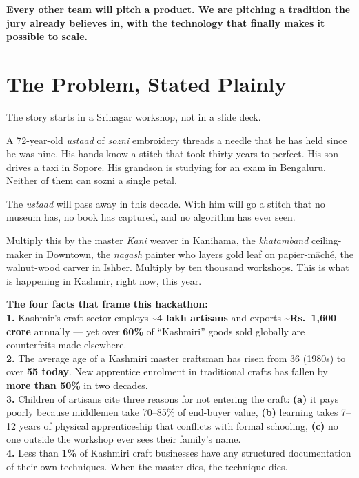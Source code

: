 \documentclass[11pt, a4paper]{article}
\begin{document}
\begin{insightbox}
\textbf{Every other team will pitch a product. We are pitching a tradition the jury already believes in, with the technology that finally makes it possible to scale.}
\end{insightbox}

\section{The Problem, Stated Plainly}

The story starts in a Srinagar workshop, not in a slide deck.

A 72-year-old {\itshape ustaad} of {\itshape sozni} embroidery threads a needle that he has held since he was nine. His hands know a stitch that took thirty years to perfect. His son drives a taxi in Sopore. His grandson is studying for an exam in Bengaluru. Neither of them can sozni a single petal.

The {\itshape ustaad} will pass away in this decade. With him will go a stitch that no museum has, no book has captured, and no algorithm has ever seen.

Multiply this by the master {\itshape Kani} weaver in Kanihama, the {\itshape khatamband} ceiling-maker in Downtown, the {\itshape naqash} painter who layers gold leaf on papier-mâché, the walnut-wood carver in Ishber. Multiply by ten thousand workshops. This is what is happening in Kashmir, right now, this year.

\begin{statbox}
\textbf{The four facts that frame this hackathon:}\\[4pt]
\textbf{1.} Kashmir's craft sector employs \textbf{\textasciitilde 4 lakh artisans} and exports \textbf{\textasciitilde Rs.\ 1{,}600 crore} annually — yet over \textbf{60\%} of ``Kashmiri'' goods sold globally are counterfeits made elsewhere.\\[3pt]
\textbf{2.} The average age of a Kashmiri master craftsman has risen from 36 (1980s) to over \textbf{55 today}. New apprentice enrolment in traditional crafts has fallen by \textbf{more than 50\%} in two decades.\\[3pt]
\textbf{3.} Children of artisans cite three reasons for not entering the craft: \textbf{(a)} it pays poorly because middlemen take 70--85\% of end-buyer value, \textbf{(b)} learning takes 7--12 years of physical apprenticeship that conflicts with formal schooling, \textbf{(c)} no one outside the workshop ever sees their family's name.\\[3pt]
\textbf{4.} Less than \textbf{1\%} of Kashmiri craft businesses have any structured documentation of their own techniques. When the master dies, the technique dies.
\end{statbox}
\end{document}
